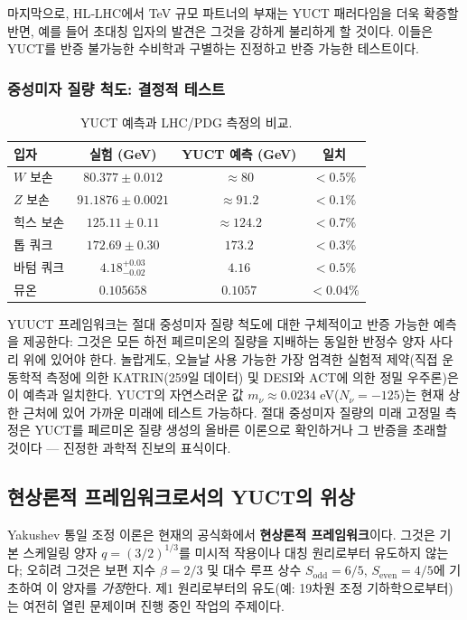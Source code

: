 \documentclass[11pt,a4paper]{article}
\begin{document}
	마지막으로, HL‑LHC에서 TeV 규모 파트너의 부재는 YUCT 패러다임을 더욱 확증할 반면, 예를 들어 초대칭 입자의 발견은 그것을 강하게 불리하게 할 것이다. 이들은 YUCT를 반증 불가능한 수비학과 구별하는 진정하고 반증 가능한 테스트이다.
	
	\subsubsection{중성미자 질량 척도: 결정적 테스트}
	\begin{table}[h]
		\centering
		\caption{YUCT 예측과 LHC/PDG 측정의 비교.}
		\normalsize
		\label{tab:lhc_comparison}
		\begin{tabular}{l c c c}
			\toprule
			입자 & 실험 (GeV) & YUCT 예측 (GeV) & 일치 \\
			\midrule
			$W$ 보손  & $80.377 \pm 0.012$ & $\approx 80$ & $<0.5\%$ \\
			$Z$ 보손  & $91.1876 \pm 0.0021$ & $\approx 91.2$ & $<0.1\%$ \\
			힉스 보손 & $125.11 \pm 0.11$ & $\approx 124.2$ & $<0.7\%$ \\
			톱 쿼크  & $172.69 \pm 0.30$ & $173.2$ & $<0.3\%$ \\
			바텀 쿼크 & $4.18^{+0.03}_{-0.02}$ & $4.16$ & $<0.5\%$ \\
			뮤온       & $0.105658$ & $0.1057$ & $<0.04\%$ \\
			\bottomrule
		\end{tabular}
	\end{table}
	
	YUUCT 프레임워크는 절대 중성미자 질량 척도에 대한 구체적이고 반증 가능한 예측을 제공한다: 그것은 모든 하전 페르미온의 질량을 지배하는 동일한 반정수 양자 사다리 위에 있어야 한다. 놀랍게도, 오늘날 사용 가능한 가장 엄격한 실험적 제약(직접 운동학적 측정에 의한 KATRIN(259일 데이터) 및 DESI와 ACT에 의한 정밀 우주론)은 이 예측과 일치한다. YUCT의 자연스러운 값 $m_\nu \approx 0.0234$ eV($N_\nu = -125$)는 현재 상한 근처에 있어 가까운 미래에 테스트 가능하다. 절대 중성미자 질량의 미래 고정밀 측정은 YUCT를 페르미온 질량 생성의 올바른 이론으로 확인하거나 그 반증을 초래할 것이다 — 진정한 과학적 진보의 표식이다.
	
	\subsection*{현상론적 프레임워크로서의 YUCT의 위상}
	
	Yakushev 통일 조정 이론은 현재의 공식화에서 \textbf{현상론적 프레임워크}이다. 그것은 기본 스케일링 양자 \(q = (3/2)^{1/3}\)를 미시적 작용이나 대칭 원리로부터 유도하지 않는다; 오히려 그것은 보편 지수 \(\beta = 2/3\) 및 대수 루프 상수 \(S_{\mathrm{odd}}=6/5\), \(S_{\mathrm{even}}=4/5\)에 기초하여 이 양자를 \emph{가정}한다. 제1 원리로부터의 유도(예: 19차원 조정 기하학으로부터)는 여전히 열린 문제이며 진행 중인 작업의 주제이다.
	
\end{document}
